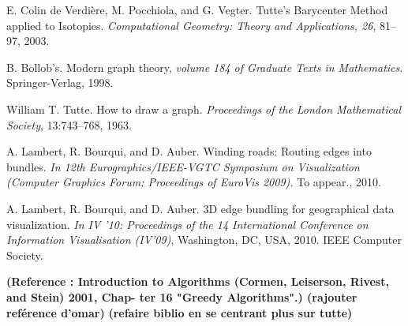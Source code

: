 \begin{thebibliography}{}

 E. Colin de Verdière, M. Pocchiola, and G. Vegter. Tutte's Barycenter Method applied to Isotopies. \emph{Computational Geometry: Theory and Applications, 26}, 81–97, 2003.

 B. Bollob's. Modern graph theory, \emph{volume 184 of Graduate Texts in Mathematics}. Springer-Verlag, 1998.

 William T. Tutte. How to draw a graph. \emph{Proceedings of the London Mathematical Society}, 13:743–768, 1963.

 A. Lambert, R. Bourqui, and D. Auber. Winding roads: Routing edges
into bundles. \emph{In 12th Eurographics/IEEE-VGTC Symposium on
Visualization (Computer Graphics Forum; Proceedings of EuroVis
2009).} To appear., 2010.

 A. Lambert, R. Bourqui, and D. Auber. 3D edge bundling for
geographical data visualization. \emph{In IV ’10: Proceedings of the 14
International Conference on Information Visualisation (IV’09)},
Washington, DC, USA, 2010. IEEE Computer Society.

\textbf{(Reference : Introduction to Algorithms (Cormen, Leiserson, Rivest, and Stein) 2001, Chap-
ter 16 "Greedy Algorithms".) (rajouter reférence d'omar)}
\textbf{(refaire biblio en se centrant plus sur tutte)}






   
\end{thebibliography}
